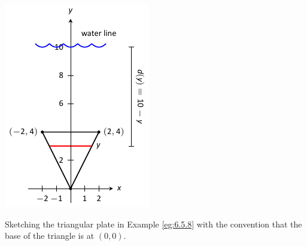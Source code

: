 \begin{marginfigure}[-8cm] %
\begin{center}
\includegraphics{figures/figfluid2c}
\end{center}
\caption{Sketching the triangular plate in Example \ref{eg:6.5.8} with the convention that the base of the triangle is at $(0,0)$.} \label{F:6.5.triangle3}
\end{marginfigure}